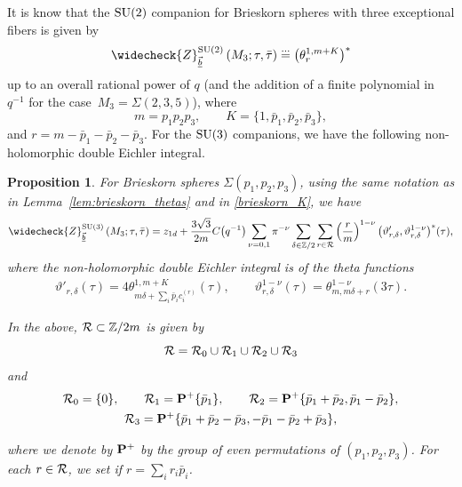 \documentclass[pdftex]{sigma}
\def\BZ{\mathbb{Z}}
\newcommand{\ZZ}{\mathbb{Z}}
\newcommand{\Zchlong}[3]{\ensuremath{\widecheck{Z}^{#1}_{#2}\left(#3;\tau,\bar{\tau}\right)}}
\def\bv{{\vec{\underline{b}}}}
\newtheorem{prop}[thm]{Proposition}
\theoremstyle{definition}
\numberwithin{equation}{section}
\begin{document}
It is know that the ${\rm SU}(2)$ companion for Brieskorn spheres with three exceptional fibers is given by~\cite{cheng20193d}
\begin{equation*}
 \Zchlong{{\rm SU}(2)}{\bv}{M_{3}}\stackrel{\dots}{=}\bigl(\theta^{1,m+K}_r\bigr)^\ast
\end{equation*}
up to an overall rational power of $q$ (and the addition of a finite polynomial in $q^{-1}$ for the case~$M_3=\Sigma(2,3,5)$), where
\begin{equation}\label{brieskorn_K}
 m=p_1p_2p_3,\qquad K=\{1,\bar p_1,\bar p_2,\bar p_3\},
\end{equation}
and $r=m-\bar p_1-\bar p_2-\bar p_3$. For the ${\rm SU}(3)$ companions, we have the following non-holomorphic double Eichler integral.
\begin{prop}\label{prop:sphere_recursive}
For Brieskorn spheres $\Sigma(p_1,p_2,p_3)$, using the same notation as in Lemma~{\rm \ref{lem:brieskorn_thetas}} and in \eqref{brieskorn_K}, we have
 \begin{gather*}%
 \Zchlong{{\rm SU}(3)}{\bv}{M_{3}}
 =z_{1d}+ \frac{3\sqrt{3}}{2m}C\bigl(q^{-1}\bigr) \sum_{\nu=0,1} \pi^{-\nu}	\sum_{\delta\in\BZ/2} \sum_{r\in {\cal R}} \left(\frac{r}{m}\right)^{1-\nu}\bigl(\vartheta'_{r,\delta},\vartheta^{1-\nu}_{r,\delta}\bigr)^\ast(\tau)
,
\end{gather*}
where the non-holomorphic double Eichler integral is of the theta functions
 \begin{gather*}
 \vartheta'_{r,\delta}(\tau)=
 4\theta^{1,m+K}_{m\delta+\sum_i \bar p_i c_i^{(r)}}(\tau),\qquad
 \vartheta^{1-\nu}_{r,\delta}(\tau) = \theta^{1-\nu}_{m,m\delta + r}(3\tau).
 \end{gather*}

In the above, ${\cal R} \subset \ZZ/2m$ is given by
\[
{\cal R} = {\cal R}_0\cup {\cal R}_1\cup {\cal R}_2\cup {\cal R}_3
\]
and
\begin{gather*}
 {\cal R}_0 = \{0\},\qquad
 {\cal R}_1 = {\bf P}^+ \{\bar p_1\},\qquad
 {\cal R}_2 = {\bf P}^+ \{\bar p_1+\bar p_2, \bar p_1-\bar p_2\},\\
 {\cal R}_3 = {\bf P}^+ \{\bar p_1+\bar p_2-\bar p_3, -\bar p_1-\bar p_2+\bar p_3\},
\end{gather*}

where we denote by ${\bf P}^+$ by the group of even permutations of $(p_1,p_2,p_3)$. For each $r\in {\cal R}$, we set  if $r=\sum_i r_i \bar p_i$.
\end{prop}
\end{document}
